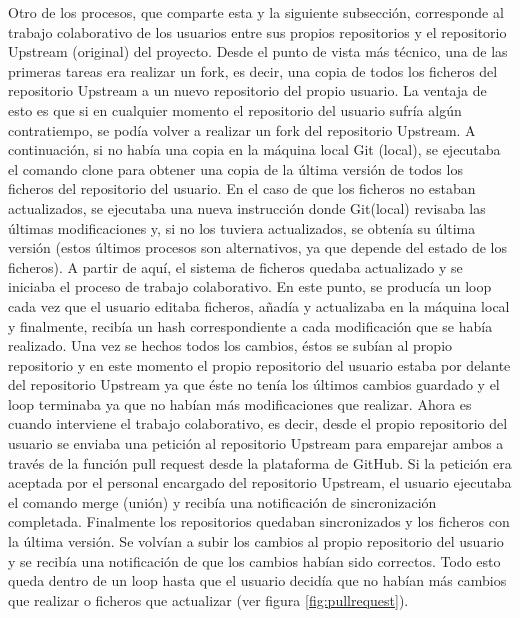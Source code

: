 Otro de los procesos, que comparte esta y la siguiente subsección, corresponde al trabajo colaborativo de los usuarios entre sus propios repositorios y el repositorio Upstream (original) del proyecto. Desde el punto de vista más técnico, una de las primeras tareas era realizar un fork, es decir, una copia de todos los ficheros del repositorio Upstream a un nuevo repositorio del propio usuario. La ventaja de esto es que si en cualquier momento el repositorio del usuario sufría algún contratiempo, se podía volver a realizar un fork del repositorio Upstream. A continuación, si no había una copia en la máquina local Git (local), se ejecutaba el comando clone para obtener una copia de la última versión de todos los ficheros del repositorio del usuario. En el caso de que los ficheros no estaban actualizados, se ejecutaba una nueva instrucción donde Git(local) revisaba las últimas modificaciones y, si no los tuviera actualizados, se obtenía su última versión (estos últimos procesos son alternativos, ya que depende del estado de los ficheros). A partir de aquí, el sistema de ficheros quedaba actualizado y se iniciaba el proceso de trabajo colaborativo. En este punto, se producía un loop cada vez que el usuario editaba ficheros, añadía y actualizaba en la máquina local y finalmente, recibía un hash correspondiente a cada modificación que se había realizado. Una vez se hechos todos los cambios, éstos se subían al propio repositorio y en este momento el propio repositorio del usuario estaba por delante del repositorio Upstream ya que éste no tenía los últimos cambios guardado y el loop terminaba ya que no habían más modificaciones que realizar. Ahora es cuando interviene el trabajo colaborativo, es decir, desde el propio repositorio del usuario se enviaba una petición al repositorio Upstream para emparejar ambos a través de la función pull request desde la plataforma de GitHub. Si la petición era aceptada por el personal encargado del repositorio Upstream, el usuario ejecutaba el comando merge (unión) y recibía una notificación de sincronización completada. Finalmente los repositorios quedaban sincronizados y los ficheros con la última versión. Se volvían a subir los cambios al propio repositorio del usuario y se recibía una notificación de que los cambios habían sido correctos. Todo esto queda dentro de un loop hasta que el usuario decidía que no habían más cambios que realizar o ficheros que actualizar (ver figura \ref{fig:pullrequest}).

